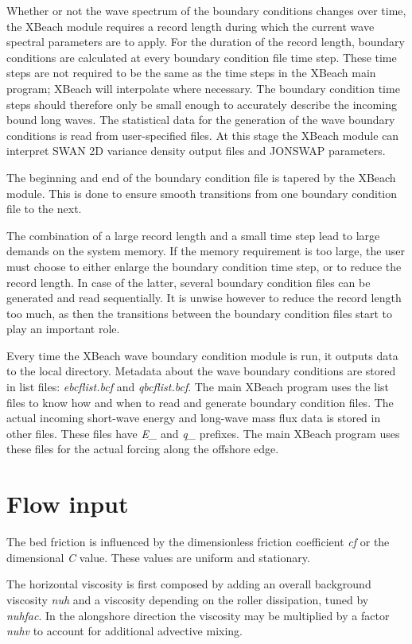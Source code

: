 Whether or not the wave spectrum of the boundary conditions changes over time, the XBeach module requires a record length during which the current wave spectral parameters are to apply. For the duration of the record length, boundary conditions are calculated at every boundary condition file time step. These time steps are not required to be the same as the time steps in the XBeach main program; XBeach will interpolate where necessary. The boundary condition time steps should therefore only be small enough to accurately describe the incoming bound long waves. The statistical data for the generation of the wave boundary conditions is read from user-specified files. At this stage the XBeach module can interpret SWAN 2D variance density output files and JONSWAP parameters. 

The beginning and end of the boundary condition file is tapered by the XBeach module. This is done to ensure smooth transitions from one boundary condition file to the next.

The combination of a large record length and a small time step lead to large demands on the system memory. If the memory requirement is too large, the user must choose to either enlarge the boundary condition time step, or to reduce the record length. In case of the latter, several boundary condition files can be generated and read sequentially. It is unwise however to reduce the record length too much, as then the transitions between the boundary condition files start to play an important role.

Every time the XBeach wave boundary condition module is run, it outputs data to the local directory. Metadata about the wave boundary conditions are stored in list files: \textit{ebcflist.bcf} and \textit{qbcflist.bcf}. The main XBeach program uses the list files to know how and when to read and generate boundary condition files. The actual incoming short-wave energy and long-wave mass flux data is stored in other files. These files have  \textit{E\_} and \textit{q\_} prefixes. The main XBeach program uses these files for the actual forcing along the offshore edge. 
\section{Flow input}

The bed friction is influenced by the dimensionless friction coefficient \textit{cf} or the dimensional \textit{C }value. These values are uniform and stationary.

The horizontal viscosity is first composed by adding an overall background viscosity \textit{nuh }and a viscosity depending on the roller dissipation, tuned by \textit{nuhfac}. In the alongshore direction the viscosity may be multiplied by a factor \textit{nuhv} to account for additional advective mixing.

